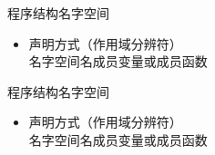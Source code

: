 \begin{frame}[fragile]{程序结构}{名字空间}
  \begin{itemize}
  \item 声明方式（作用域分辨符）\\
    名字空间名\cppinline{::}成员变量或成员函数\\
    \begin{center}
      \begin{minipage}{0.45\linewidth}
      \end{minipage}\qquad
      \begin{minipage}{0.45\linewidth}
      \end{minipage}
    \end{center}    
  \end{itemize}
\end{frame}

\begin{frame}[fragile]{程序结构}{名字空间}%
  \begin{itemize}
  \item 声明方式（作用域分辨符）\\
    名字空间名\cppinline{::}成员变量或成员函数\\
    \begin{center}
      \begin{minipage}{0.45\linewidth}
      \end{minipage}\qquad
      \begin{minipage}{0.45\linewidth}
      \end{minipage}
    \end{center}    
  \end{itemize}
\end{frame}


